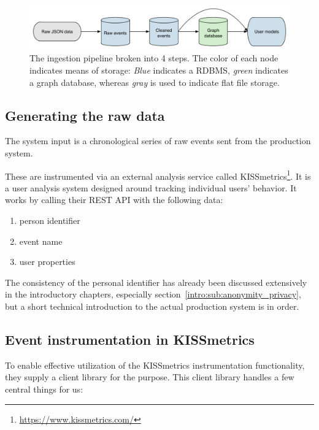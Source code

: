 \begin{figure}[h]
  \centering
    \includegraphics[width=\textwidth]{Figures/ingestion-pipeline}
  \caption{The ingestion pipeline broken into 4 steps. The color of each node indicates means of storage: \emph{Blue} indicates a RDBMS, \emph{green} indicates a graph database, whereas \emph{gray} is used to indicate flat file storage.}
  \label{fig:ingestion-pipeline}
\end{figure}

\subsection{Generating the raw data}
\label{approach:sub:generating_data}

The system input is a chronological series of raw events sent from the production system.

These are instrumented via an external analysis service called KISSmetrics\footnote{\url{https://www.kissmetrics.com/}}. It is a user analysis system designed around tracking individual users' behavior. It works by calling their REST API with the following data:

\begin{enumerate}
  \item person identifier
  \item event name
  \item user properties
\end{enumerate}

The consistency of the personal identifier has already been discussed extensively in the introductory chapters, especially section~\ref{intro:sub:anonymity_privacy}, but a short technical introduction to the actual production system is in order.

\subsection{Event instrumentation in KISSmetrics}
\label{approach:sec:event_instrumentation}

To enable effective utilization of the KISSmetrics instrumentation functionality, they supply a client library for the purpose. This client library handles a few central things for us:

